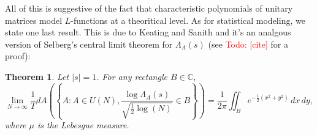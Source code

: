 \documentclass[12pt]{book}
\newtheorem{theorem}{Theorem}[section]
\theoremstyle{definition}\newframedtheorem{method}{Method}
\newcommand{\C}{\mathbb{C}}
\renewcommand{\L}{\Lambda}
\newcommand{\<}{\langle}
\renewcommand{\>}{\rangle}
\newcommand{\todo}[1]{\textcolor{red}{\sf Todo: [#1]}}
\begin{document}
      All of this is suggestive of the fact that characteristic polynomials of unitary matrices model $L$-functions at a theoritical level. As for statistical modeling, we state one last result. This is due to Keating and Sanith and it's an analgous version of Selberg's central limit theorem for $\L_{A}(s)$ (see \todo{cite} for a proof):

      \begin{theorem}
        Let $|s| = 1$. For any rectangle $B \in \C$,
        \[
          \lim_{N \to \infty}\frac{1}{T}dA\left(\left\{A:A \in U(N),\frac{\log\L_{A}(s)}{\sqrt{\frac{1}{2}\log(N)}} \in B\right\}\right) = \frac{1}{2\pi}\iint_{B}e^{-\frac{1}{2}(x^{2}+y^{2})}\,dx\,dy,
        \]
        where $\mu$ is the Lebesgue measure.
      \end{theorem}
\appendix
\printindex


\end{document}
